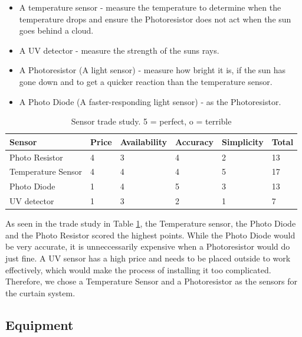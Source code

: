 \documentclass[a4paper,12pt]{article}
\begin{document}
\begin{itemize}
    \item A temperature sensor - measure the temperature to determine when the temperature drops and ensure the Photoresistor does not act when the sun goes behind a cloud.
    \item A UV detector - measure the strength of the suns rays.
    \item A Photoresistor (A light sensor) - measure how bright it is, if the sun has gone down and to get a quicker reaction than the temperature sensor.
    \item A Photo Diode (A faster-responding light sensor) - as the Photoresistor.
\end{itemize}

\begin{table}[h!]
    \caption{Sensor trade study. 5 = perfect, o = terrible}
    \begin{tabular}{l | l | l | l | l | l}
        Sensor & Price & Availability & Accuracy & Simplicity & Total\\
        \hline
        Photo Resistor & 4 & 3 & 4 & 2 & 13 \\
        Temperature Sensor & 4 & 4 & 4 & 5 & 17 \\
        Photo Diode & 1 & 4 & 5 & 3 & 13 \\
        UV detector & 1 & 3 & 2 & 1 & 7 \\

    \end{tabular}
    \label{tab:sensor}

\end{table}

As seen in the trade study in Table \ref{tab:sensor}, the Temperature sensor, the Photo Diode and the Photo Resistor scored the highest points. 
While the Photo Diode would be very accurate, it is unneccessarily expensive when a Photoresistor would do just fine. 
A UV sensor has a high price and needs to be placed outside to work effectively, which would make the process of installing it too complicated. 
Therefore, we chose a Temperature Sensor and a Photoresistor as the sensors for the curtain system.

\subsection{Equipment}                                                                                                                                                                                                                                                                                                                                                                                                                                                                                                                                                              
\end{document}
